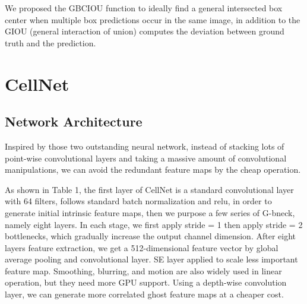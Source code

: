 We proposed the GBCIOU function to ideally find a general intersected box center when multiple box predictions occur in the same image, in addition to the GIOU (general interaction of union) computes the deviation between ground truth and the prediction.

\section{CellNet}
\label{sec:ipsum}


\subsection{Network Architecture} %
\label{sub:Network Architecture_2}
Inspired by those two outstanding neural network\cite{19}\cite{20}, instead of stacking lots of point-wise convolutional layers and taking a massive amount of convolutional manipulations, we can avoid the redundant feature maps by the cheap operation. 

As shown in Table 1, the first layer of CellNet is a standard convolutional layer with 64 filters, follows standard batch normalization and relu, in order to generate initial intrinsic feature maps, then we purpose a few series of G-bneck, namely eight layers. In each stage, we first apply stride = 1 then apply stride = 2 bottlenecks, which gradually increase the output channel dimension. After eight layers feature extraction, we get a 512-dimensional feature vector by global average pooling and convolutional layer. SE layer applied to scale less important feature map. Smoothing, blurring, and motion are also widely used in linear operation, but they need more GPU support. Using a depth-wise convolution layer, we can generate more correlated ghost feature maps at a cheaper cost.



